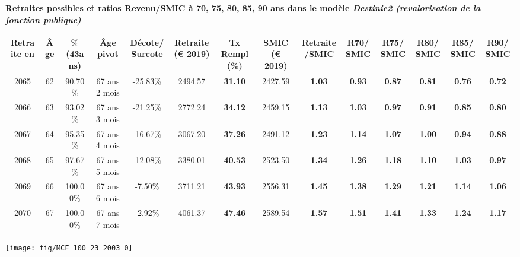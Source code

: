 \vspace{0.1cm} 
{\bf \noindent Retraites possibles et ratios Revenu/SMIC à 70, 75, 80, 85, 90 ans dans le modèle \emph{Destinie2 (revalorisation de la fonction publique)}}  
 
\begin{adjustbox}{max width=\textwidth} 
\begin{tabular}[htb]{|c|c||c|c|c||c|c||c|c||c|c|c|c|c|} 
\hline 
 Retraite en &  Âge &  \%(43ans) &  Âge pivot &  Décote/Surcote &  Retraite (\euro{} 2019) &  Tx Rempl(\%) &  SMIC (\euro{} 2019) &  Retraite/SMIC &  R70/SMIC &  R75/SMIC &  R80/SMIC &  R85/SMIC &  R90/SMIC \\ 
\hline \hline 
 2065 &  62 &  90.70\% &  67 ans 2 mois &  -25.83\% &  2494.57 &  {\bf 31.10} &  2427.59 &  {\bf 1.03} &  {\bf {\color{red} 0.93}} &  {\bf {\color{red} 0.87}} &  {\bf {\color{red} 0.81}} &  {\bf {\color{red} 0.76}} &  {\bf {\color{red} 0.72}} \\ 
\hline 
 2066 &  63 &  93.02\% &  67 ans 3 mois &  -21.25\% &  2772.24 &  {\bf 34.12} &  2459.15 &  {\bf 1.13} &  {\bf 1.03} &  {\bf {\color{red} 0.97}} &  {\bf {\color{red} 0.91}} &  {\bf {\color{red} 0.85}} &  {\bf {\color{red} 0.80}} \\ 
\hline 
 2067 &  64 &  95.35\% &  67 ans 4 mois &  -16.67\% &  3067.20 &  {\bf 37.26} &  2491.12 &  {\bf 1.23} &  {\bf 1.14} &  {\bf 1.07} &  {\bf 1.00} &  {\bf {\color{red} 0.94}} &  {\bf {\color{red} 0.88}} \\ 
\hline 
 2068 &  65 &  97.67\% &  67 ans 5 mois &  -12.08\% &  3380.01 &  {\bf 40.53} &  2523.50 &  {\bf 1.34} &  {\bf 1.26} &  {\bf 1.18} &  {\bf 1.10} &  {\bf 1.03} &  {\bf {\color{red} 0.97}} \\ 
\hline 
 2069 &  66 &  100.00\% &  67 ans 6 mois &  -7.50\% &  3711.21 &  {\bf 43.93} &  2556.31 &  {\bf 1.45} &  {\bf 1.38} &  {\bf 1.29} &  {\bf 1.21} &  {\bf 1.14} &  {\bf 1.06} \\ 
\hline 
 2070 &  67 &  100.00\% &  67 ans 7 mois &  -2.92\% &  4061.37 &  {\bf 47.46} &  2589.54 &  {\bf 1.57} &  {\bf 1.51} &  {\bf 1.41} &  {\bf 1.33} &  {\bf 1.24} &  {\bf 1.17} \\ 
\hline 
\hline 
\end{tabular} 
\end{adjustbox} 
 
 \vspace{0.1cm} 

 {\hspace{-2.2cm}\texttt{[image: fig/MCF\_100\_23\_2003\_0]}} 


